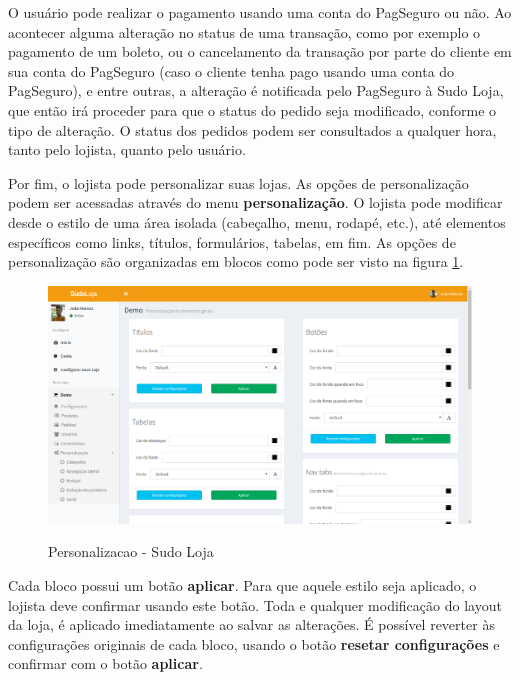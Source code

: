 \documentclass[a4paper,12pt]{monografia}
\begin{document}
O usuário pode realizar o pagamento usando uma conta do PagSeguro ou não. Ao acontecer alguma alteração no status de uma transação, como por exemplo o pagamento de um boleto, ou o cancelamento da transação por parte do cliente em sua conta do PagSeguro (caso o cliente tenha pago usando uma conta do PagSeguro), e entre outras, a alteração é notificada pelo PagSeguro à Sudo Loja, que então irá proceder para que o status do pedido seja modificado, conforme o tipo de alteração. O status dos pedidos podem ser consultados a qualquer hora, tanto pelo lojista, quanto pelo usuário.

Por fim, o lojista pode personalizar suas lojas. As opções de personalização podem ser acessadas através do menu \textbf{personalização}. O lojista pode modificar desde o estilo de uma área isolada (cabeçalho, menu, rodapé, etc.), até elementos específicos como links, títulos, formulários, tabelas, em fim. As opções de personalização são organizadas em blocos como pode ser visto na figura \ref{fig:personalizacao}.

\begin{figure}[H]
\centering
\caption{Personalizacao - Sudo Loja}
\centering
\includegraphics[width=15cm]{img/sistema/personalizacao.png.eps}\\
\label{fig:personalizacao}
\end{figure} 

Cada bloco possui um botão \textbf{aplicar}. Para que aquele estilo seja aplicado, o lojista deve confirmar usando este botão. Toda e qualquer modificação do layout da loja, é aplicado imediatamente ao salvar as alterações. É possível reverter às configurações originais de cada bloco, usando o botão \textbf{resetar configurações} e confirmar com o botão \textbf{aplicar}.

\end{document}
